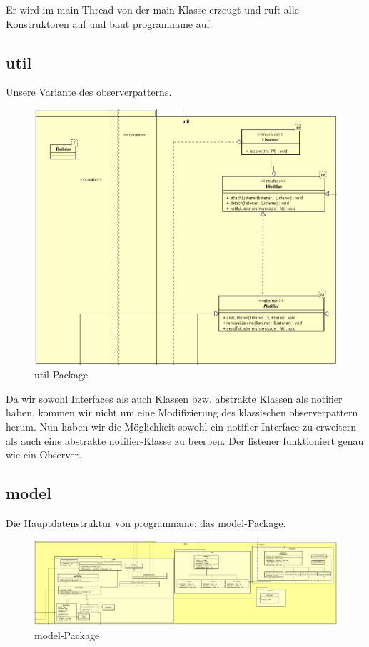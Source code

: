 Er wird im main-Thread von der main-Klasse erzeugt und ruft alle Konstruktoren auf
und baut \gls{programname} auf.

\subsection{util}
\label{subsec:util}

Unsere Variante des \gls{observerpattern}s.

\begin{figure}[H]
  \centering
  \includegraphics[width=\textwidth]{../diagramimages/util.png}
  \caption{util-Package}
\end{figure}

Da wir sowohl Interfaces als auch Klassen bzw. abstrakte Klassen als
\gls{notifier} haben, kommen wir nicht um eine Modifizierung des klassischen
\gls{observerpattern} herum. Nun haben wir die Möglichkeit sowohl ein
\gls{notifier}-Interface zu erweitern als auch eine abstrakte
\gls{notifier}-Klasse zu beerben. Der \gls{listener} funktioniert genau wie ein
Observer.


\subsection{model}
\label{subsec:model}

Die Hauptdatenstruktur von \gls{programname}: das model-Package.

\begin{figure}[H]
  \centering
  \includegraphics[width=\textwidth]{../diagramimages/model.png}
  \caption{model-Package}
\end{figure}

